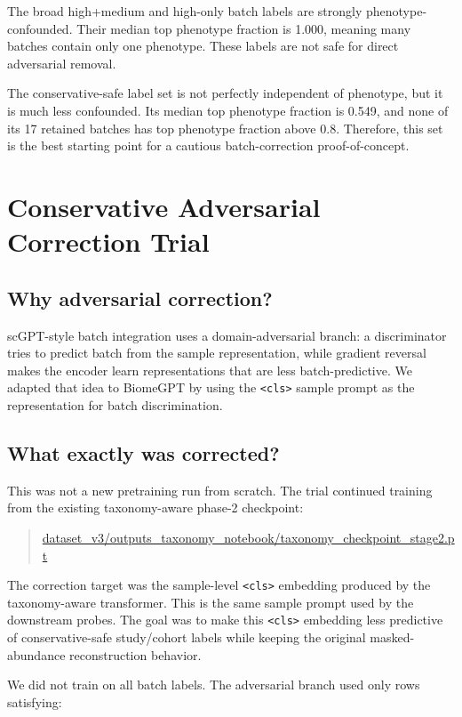 \documentclass[11pt]{article}
\newcommand{\code}[1]{\texttt{\small #1}}
\newcommand{\filepath}[1]{\begingroup\urlstyle{tt}\small\url{#1}\endgroup}
\begin{document}
The broad high+medium and high-only batch labels are strongly phenotype-confounded.
Their median top phenotype fraction is 1.000, meaning many batches contain only one
phenotype. These labels are not safe for direct adversarial removal.

The conservative-safe label set is not perfectly independent of phenotype, but it is much
less confounded. Its median top phenotype fraction is 0.549, and none of its 17 retained
batches has top phenotype fraction above 0.8. Therefore, this set is the best starting
point for a cautious batch-correction proof-of-concept.

\section{Conservative Adversarial Correction Trial}

\subsection{Why adversarial correction?}

scGPT-style batch integration uses a domain-adversarial branch: a discriminator tries to
predict batch from the sample representation, while gradient reversal makes the encoder
learn representations that are less batch-predictive. We adapted that idea to BiomeGPT by
using the \code{<cls>} sample prompt as the representation for batch discrimination.

\subsection{What exactly was corrected?}

This was not a new pretraining run from scratch. The trial continued training from the
existing taxonomy-aware phase-2 checkpoint:

\begin{quote}
\filepath{dataset_v3/outputs_taxonomy_notebook/taxonomy_checkpoint_stage2.pt}
\end{quote}

The correction target was the sample-level \code{<cls>} embedding produced by the
taxonomy-aware transformer. This is the same sample prompt used by the downstream probes.
The goal was to make this \code{<cls>} embedding less predictive of conservative-safe
study/cohort labels while keeping the original masked-abundance reconstruction behavior.

We did not train on all batch labels. The adversarial branch used only rows satisfying:
\end{document}
